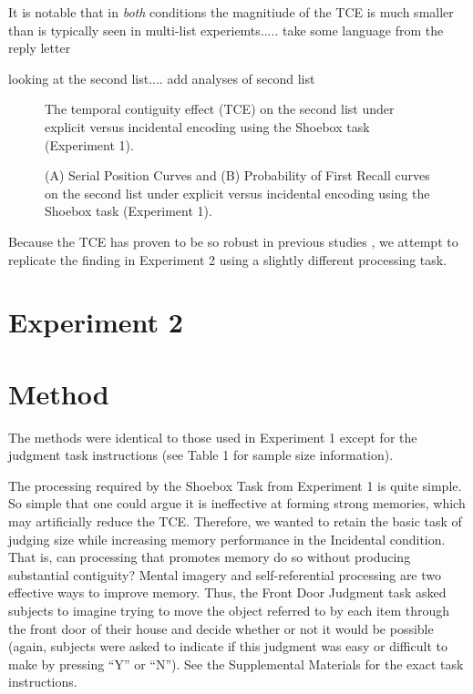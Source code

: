 \documentclass[jou,natbib,floatsintext]{apa6} %
\begin{document}
\color{black}


\color{red}
\label{TODO-5} It is notable that in \emph{both} conditions the magnitiude of the TCE is much smaller than is typically seen in multi-list experiemts..... take some language from the reply letter

\label{TODO-6} looking at the second list.... add analyses of second list

\begin{figure*}
\caption{The temporal contiguity effect (TCE) on the second list under explicit versus incidental encoding using the Shoebox task (Experiment 1). \paneltext}
\label{e1_l2_crp}
\end{figure*}


\begin{figure}
\caption{(A) Serial Position Curves and (B) Probability of First Recall curves on the second list under explicit versus incidental encoding using the Shoebox task (Experiment 1). \spcpaneltext}
\label{e1_l2_spc}
\end{figure}


\color{black}




Because the TCE has proven to be so robust in previous studies \citep{HealKaha17}, we attempt to replicate the finding in Experiment 2 using a slightly different processing task.

\section{Experiment 2}
\section{Method}

The methods were identical to those used in Experiment 1 except for the judgment task instructions (see Table 1 for sample size information).

The processing required by the Shoebox Task from Experiment 1 is quite simple. So simple that one could argue it is  ineffective at forming strong memories, which may artificially reduce the TCE. Therefore, we wanted to retain the basic task of judging size while increasing memory performance in the Incidental condition. That is, can processing that promotes memory do so without producing substantial contiguity? Mental imagery and self-referential processing are two effective ways to improve memory. Thus, the Front Door Judgment task asked subjects to imagine trying to move the object referred to by each item through the front door of their house and decide whether or not it would be possible (again, subjects were asked to indicate if this judgment was easy or difficult to make by pressing ``Y'' or ``N''). See the Supplemental Materials for the exact task instructions.
\end{document}
